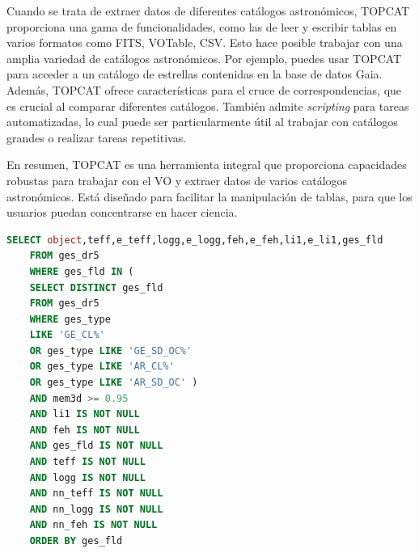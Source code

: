 Cuando se trata de extraer datos de diferentes catálogos astronómicos, TOPCAT proporciona una gama de funcionalidades, como las de leer y escribir tablas en varios formatos como FITS, VOTable, CSV. Esto hace posible trabajar con una amplia variedad de catálogos astronómicos. Por ejemplo, puedes usar TOPCAT para acceder a un catálogo de estrellas contenidas en la base de datos Gaia. Además, TOPCAT ofrece características para el cruce de correspondencias, que es crucial al comparar diferentes catálogos. También admite \textit{scripting} para tareas automatizadas, lo cual puede ser particularmente útil al trabajar con catálogos grandes o realizar tareas repetitivas.\par

En resumen, TOPCAT es una herramienta integral que proporciona capacidades robustas para trabajar con el VO y extraer datos de varios catálogos astronómicos. Está diseñado para facilitar la manipulación de tablas, para que los usuarios puedan concentrarse en hacer ciencia.\par


\begin{lstlisting}[language=SQL, caption={Consulta TOPCAT sobre el catálogo GES DR5 para obtener los componentes de los cúmulos abiertos para los cuales se ha determinado una pertenecia mínima del 0.95\%. Las columnas obtenidas informan sobre la identificador de la estrella, $\teff$, $\gsurf$, $\feh$, A(Li) y sus errores asociados, y el identificador del cúmulo al que pertenece.}, label={lst:consulta}]
	SELECT object,teff,e_teff,logg,e_logg,feh,e_feh,li1,e_li1,ges_fld
	FROM ges_dr5 
	WHERE ges_fld IN (
	SELECT DISTINCT ges_fld
	FROM ges_dr5 
	WHERE ges_type 
	LIKE 'GE_CL%' 
	OR ges_type LIKE 'GE_SD_OC%' 
	OR ges_type LIKE 'AR_CL%' 
	OR ges_type LIKE 'AR_SD_OC' )
	AND mem3d >= 0.95
	AND li1 IS NOT NULL
	AND feh IS NOT NULL
	AND ges_fld IS NOT NULL
	AND teff IS NOT NULL
	AND logg IS NOT NULL
	AND nn_teff IS NOT NULL
	AND nn_logg IS NOT NULL
	AND nn_feh IS NOT NULL
	ORDER BY ges_fld
\end{lstlisting}




